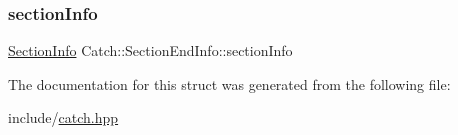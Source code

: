 \mbox{\label{struct_catch_1_1_section_end_info_a2d44793392cb83735d086d726822abe9}} 
\subsubsection{\texorpdfstring{section\+Info}{sectionInfo}}
{\footnotesize\ttfamily \mbox{\hyperlink{struct_catch_1_1_section_info}{Section\+Info}} Catch\+::\+Section\+End\+Info\+::section\+Info}



The documentation for this struct was generated from the following file\+:\begin{DoxyCompactItemize}
\item 
include/\mbox{\hyperlink{catch_8hpp}{catch.\+hpp}}\end{DoxyCompactItemize}
